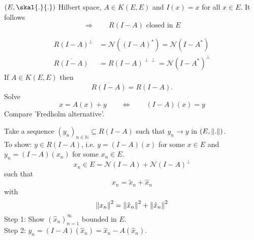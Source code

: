 \begin{beispiel}
	$(E,\skal{.}{.})$ Hilbert space, $A \in K(E,E)$ and $I(x)=x$ for all $x \in E$. It follows
	\[
		\Rightarrow  \qquad R(I-A) \text{ closed in $E$}
	\]
\begin{bemerkung}
	\begin{align*}
		R(I-A)^{\perp} &= \mathcal{N}((I-A)^{*}) = \mathcal{N}(I-A^{*}) \\
		\overline{R(I-A)} &= R(I-A)^{\perp \perp} = \mathcal{N}(I-A^{*})^{\perp}
	\end{align*}
	If $A \in K(E,E)$ then
	\[
		\overline{R(I-A)} = R(I-A).
	\]
	Solve \[
		x = A(x) + y \qquad \Leftrightarrow \qquad (I-A)(x) = y
	\]
	Compare 'Fredholm alternative'.
\end{bemerkung}
\end{beispiel}
\begin{beweis}
	Take a sequence $(y_n)_{n \in \mathbb{N}} \subseteq R(I-A)$ such that $y_n \to y$ in $(E,\norm{.})$. \\
	To show: $y \in R(I-A)$, i.e. $y = (I-A)(x)$ for some $x \in E$ and $y_n = (I-A)(x_n)$ for some $x_n \in E$.
	\[
		x_n \in E = \mathcal{N}(I-A) + \mathcal{N}(I-A)^{\perp}
	\]
	such that
	\[
		x_n = \tilde x_n + \hat x_n 
	\]
	with
	\[
		\norm{x_n}^2 = \norm{\tilde x_n}^2 + \norm{\hat x_n}^2
	\]
	Step 1: Show $(\hat x_n)_{n=1}^{\infty}$ bounded in $E$. \\
	Step 2: $y_n = (I-A)( \hat x_n) = \hat x_n - A( \hat x_n)$. \\
\end{beweis}